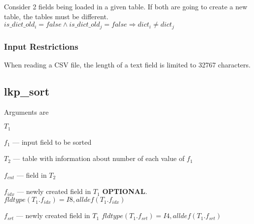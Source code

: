 \begin{invariant}
Consider 2 fields being loaded in a given table. If both are going to
create a new table, the tables must be different. 
\(is\_dict\_old_i = false \wedge is\_dict\_old_j = false \Rightarrow dict_i
\neq dict_j\)
\end{invariant}

\subsubsection{Input Restrictions}
\label{Input_Restrictions}

\be
\item 
When reading a CSV file, the length of a text field is limited to 32767
characters.
\ee

% 
\subsection{lkp\_sort}
\label{lkp_sort}

Arguments are 
\be
\item \(T_1\)
\item \(f_1\) --- input field to be sorted
\item \(T_2\) --- table with information about number of each value of
\(f_1\)
\item \(f_{cnt}\) --- field in \(T_2\)
\item \(f_{idx}\) --- newly created field in \(T_1\) {\bf OPTIONAL}.
\(fldtype(T_1.f_{idx}) = I8, alldef(T_1.f_{idx})\)
\item \(f_{srt}\) --- newly created field in \(T_1\)
\(fldtype(T_1.f_{srt}) = I4, alldef(T_1.f_{srt})\)
\ee

